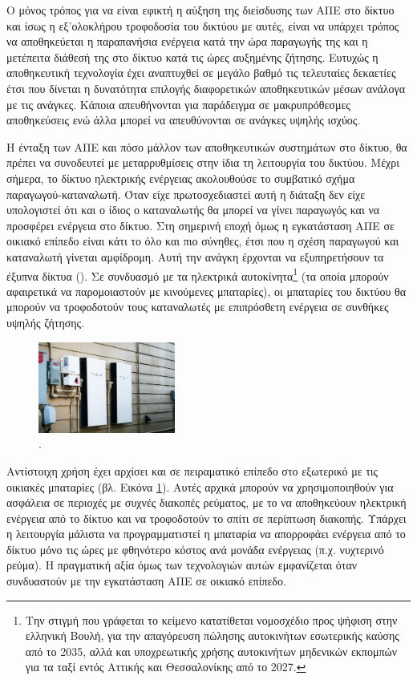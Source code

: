 \documentclass[12pt]{report}
\begin{document}
Ο μόνος τρόπος για να είναι εφικτή η αύξηση της διείσδυσης των ΑΠΕ στο δίκτυο και ίσως η εξ'ολοκλήρου τροφοδοσία του δικτύου με αυτές, είναι να υπάρχει τρόπος να αποθηκεύεται η παραπανήσια ενέργεια κατά την ώρα παραγωγής της και η 
μετέπειτα διάθεσή της στο δίκτυο κατά τις ώρες αυξημένης ζήτησης. Ευτυχώς η αποθηκευτική τεχνολογία έχει αναπτυχθεί σε μεγάλο βαθμό τις τελευταίες δεκαετίες έτσι που δίνεται η δυνατότητα επιλογής διαφορετικών 
αποθηκευτικών μέσων ανάλογα με τις ανάγκες. Κάποια απευθήνονται για παράδειγμα σε μακρυπρόθεσμες αποθηκεύσεις ενώ άλλα μπορεί να απευθύνονται σε ανάγκες υψηλής ισχύος. 

Η ένταξη των ΑΠΕ και πόσο μάλλον των αποθηκευτικών συστημάτων στο δίκτυο, θα πρέπει να συνοδευτεί με μεταρρυθμίσεις στην ίδια τη λειτουργία του δικτύου. Μέχρι σήμερα, το δίκτυο ηλεκτρικής ενέργειας ακολουθούσε το συμβατικό σχήμα 
παραγωγού-καταναλωτή. Όταν είχε πρωτοσχεδιαστεί αυτή η διάταξη δεν είχε υπολογιστεί ότι και ο ίδιος ο καταναλωτής θα μπορεί να γίνει παραγωγός και να προσφέρει ενέργεια στο δίκτυο. Στη σημερινή εποχή όμως η εγκατάσταση ΑΠΕ σε 
οικιακό επίπεδο είναι κάτι το όλο και πιο σύνηθες, έτσι που η σχέση παραγωγού και καταναλωτή γίνεται αμφίδρομη. Αυτή την ανάγκη έρχονται να εξυπηρετήσουν τα έξυπνα δίκτυα ({}). Σε συνδυασμό με τα ηλεκτρικά 
αυτοκίνητα\footnote{Την στιγμή που γράφεται το κείμενο κατατίθεται νομοσχέδιο προς ψήφιση στην ελληνική Βουλή, για την απαγόρευση πώλησης αυτοκινήτων εσωτερικής καύσης από το 2035, αλλά και υποχρεωτικής χρήσης αυτοκινήτων μηδενικών 
εκπομπών για τα ταξί εντός Αττικής και Θεσσαλονίκης από το 2027.} (τα οποία μπορούν αφαιρετικά να παρομοιαστούν με κινούμενες μπαταρίες), οι μπαταρίες του δικτύου θα μπορούν να τροφοδοτούν τους καταναλωτές με επιπρόσθετη ενέργεια σε 
συνθήκες υψηλής ζήτησης.

\begin{figure}[h]
				\center
				\includegraphics[width=0.4\textwidth]{powerwall}
				\captionsetup{name=Εικόνα}
				\caption{{}.}
				\label{fig:powerwall}
\end{figure}

Αντίστοιχη χρήση έχει αρχίσει και σε πειραματικό επίπεδο στο εξωτερικό με τις οικιακές μπαταρίες (βλ. Εικόνα \ref{fig:powerwall}). Αυτές αρχικά μπορούν να χρησιμοποιηθούν για ασφάλεια σε περιοχές με συχνές διακοπές ρεύματος, με το 
να αποθηκεύουν ηλεκτρική ενέργεια από το δίκτυο και να τροφοδοτούν το σπίτι σε περίπτωση διακοπής. Υπάρχει η λειτουργία μάλιστα να προγραμματιστεί η μπαταρία να απορροφάει ενέργεια από το δίκτυο μόνο τις ώρες με φθηνότερο κόστος 
ανά μονάδα ενέργειας (π.χ. νυχτερινό ρεύμα). Η πραγματική αξία όμως των τεχνολογιών αυτών εμφανίζεται όταν συνδυαστούν με την εγκατάσταση ΑΠΕ σε οικιακό επίπεδο. 
\end{document}
